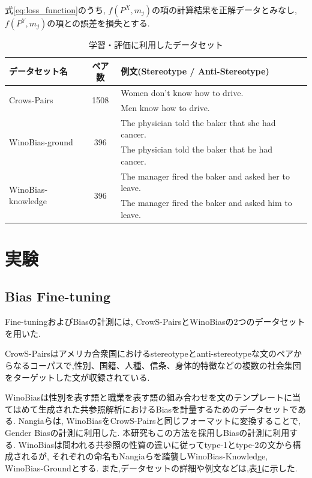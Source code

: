 \documentclass[
  platex, dvipdfmx %
]{nlp2021}
\begin{document}
式\ref{eq:loss_function}のうち, $f(P^X, m_j)$の項の計算結果を正解データとみなし, $f(P^Y, m_j)$の項との誤差を損失とする.


\begin{table}[h]
\centering
\begin{tabular}{lcll}
\hline
データセット名 & ペア数 & 例文(Stereotype / Anti-Stereotype) \\
\hline
\multirow{2}{*}{Crows-Pairs} & \multirow{2}{*}{1508} & Women don't know how to drive.\\
 & & Men know how to drive. \\
\hline
\multirow{2}{*}{WinoBias-ground} & \multirow{2}{*}{396} & The physician told the baker that she had cancer.\\
 & & The physician told the baker that he had cancer. \\
\hline
\multirow{2}{*}{WinoBias-knowledge} & \multirow{2}{*}{396} & The manager fired the baker and asked her to leave.\\
 & & The manager fired the baker and asked him to leave. \\
\hline
\end{tabular}
\caption{学習・評価に利用したデータセット}
\label{tab:datasets}
\end{table}

\section{実験}
\subsection{Bias Fine-tuning}
Fine-tuningおよびBiasの計測には, CrowS-Pairs\cite{nangia2020crows}とWinoBias\cite{zhao-etal-2018-gender}の2つのデータセットを用いた.

CrowS-Pairsはアメリカ合衆国におけるstereotypeとanti-stereotypeな文のペアからなるコーパスで,性別、国籍、人種、信条、身体的特徴などの複数の社会集団をターゲットした文が収録されている.

WinoBiasは性別を表す語と職業を表す語の組み合わせを文のテンプレートに当てはめて生成された共参照解析におけるBiasを計量するためのデータセットである. Nangiaら\cite{nangia2020crows}は, WinoBiasをCrowS-Pairsと同じフォーマットに変換することで, Gender Biasの計測に利用した. 本研究もこの方法を採用しBiasの計測に利用する. WinoBiasは問われる共参照の性質の違いに従ってtype-1とtype-2の文から構成されるが, それぞれの命名もNangiaらを踏襲しWinoBias-Knowledge, WinoBias-Groundとする.
また,データセットの詳細や例文などは,表\ref{tab:datasets}に示した.
\end{document}
